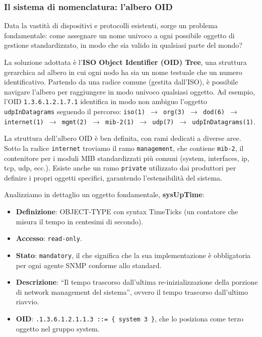 \subsubsection{Il sistema di nomenclatura: l'albero OID}

Data la vastità di dispositivi e protocolli esistenti, sorge un problema
fondamentale: come assegnare un nome univoco a ogni possibile oggetto di
gestione standardizzato, in modo che sia valido in qualsiasi parte del mondo?

La soluzione adottata è l'\textbf{ISO Object Identifier (OID) Tree}, una
struttura gerarchica ad albero in cui ogni nodo ha sia un nome testuale che un
numero identificativo. Partendo da una radice comune (gestita dall'ISO), è
possibile navigare l'albero per raggiungere in modo univoco qualsiasi oggetto.
Ad esempio, l'OID \texttt{1.3.6.1.2.1.7.1} identifica in modo non ambiguo
l'oggetto \texttt{udpInDatagrams} seguendo il percorso:
\texttt{iso(1) $\to$ org(3) $\to$ dod(6) $\to$ internet(1) $\to$ mgmt(2)
$\to$ mib-2(1) $\to$ udp(7) $\to$ udpInDatagrams(1)}.

La struttura dell'albero OID è ben definita, con rami dedicati a diverse aree.
Sotto la radice \texttt{internet} troviamo il ramo \texttt{management}, che
contiene \texttt{mib-2}, il contenitore per i moduli MIB standardizzati più
comuni (system, interfaces, ip, tcp, udp, ecc.). Esiste anche un ramo
\texttt{private} utilizzato dai produttori per definire i propri oggetti
specifici, garantendo l'estensibilità del sistema.

Analizziamo in dettaglio un oggetto fondamentale, \textbf{sysUpTime}:

\begin{itemize}
\item \textbf{Definizione}: OBJECT-TYPE con syntax TimeTicks (un contatore che
misura il tempo in centesimi di secondo).
\item \textbf{Accesso}: \texttt{read-only}.
\item \textbf{Stato}: \texttt{mandatory}, il che significa che la sua
implementazione è obbligatoria per ogni agente SNMP conforme allo standard.
\item \textbf{Descrizione}: ``Il tempo trascorso dall'ultima re-inizializzazione
della porzione di network management del sistema'', ovvero il tempo
trascorso dall'ultimo riavvio.
\item \textbf{OID}: \texttt{.1.3.6.1.2.1.1.3 ::= \{ system 3 \}}, che lo
posiziona come terzo oggetto nel gruppo system.
\end{itemize}

